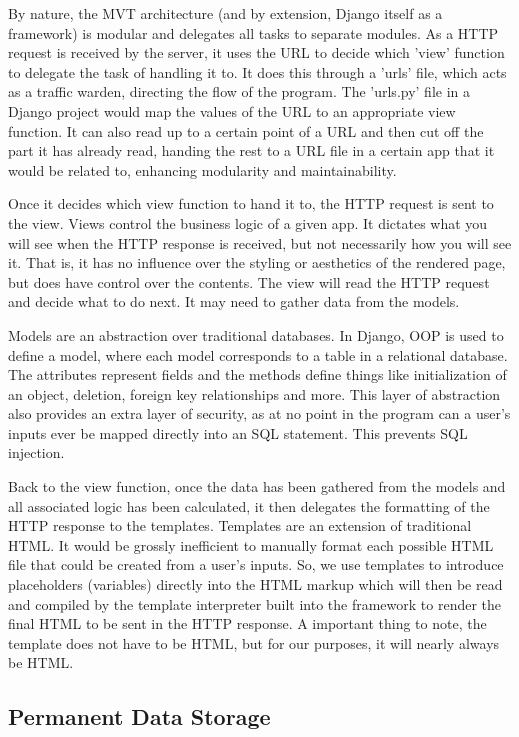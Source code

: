 \documentclass{article}
\begin{document}
By nature, the MVT architecture (and by extension, Django itself as a framework) is modular and delegates all tasks to separate modules. As a HTTP request is received by the server, it uses the URL to decide which 'view' function to delegate the task of handling it to. It does this through a 'urls' file, which acts as a traffic warden, directing the flow of the program. The 'urls.py' file in a Django project would map the values of the URL to an appropriate view function. It can also read up to a certain point of a URL and then cut off the part it has already read, handing the rest to a URL file in a certain app that it would be related to, enhancing modularity and maintainability. 

Once it decides which view function to hand it to, the HTTP request is sent to the view. Views control the business logic of a given app. It dictates what you will see when the HTTP response is received, but not necessarily how you will see it. That is, it has no influence over the styling or aesthetics of the rendered page, but does have control over the contents. The view will read the HTTP request and decide what to do next. It may need to gather data from the models. 

Models are an abstraction over traditional databases. In Django, OOP is used to define a model, where each model corresponds to a table in a relational database. The attributes represent fields and the methods define things like initialization of an object, deletion, foreign key relationships and more. This layer of abstraction also provides an extra layer of security, as at no point in the program can a user's inputs ever be mapped directly into an SQL statement. This prevents SQL injection. 

Back to the view function, once the data has been gathered from the models and all associated logic has been calculated, it then delegates the formatting of the HTTP response to the templates. Templates are an extension of traditional HTML. It would be grossly inefficient to manually format each possible HTML file that could be created from a user's inputs. So, we use templates to introduce placeholders (variables) directly into the HTML markup which will then be read and compiled by the template interpreter built into the framework to render the final HTML to be sent in the HTTP response. A important thing to note, the template does not have to be HTML, but for our purposes, it will nearly always be HTML. 

\subsection{Permanent Data Storage}
\end{document}
